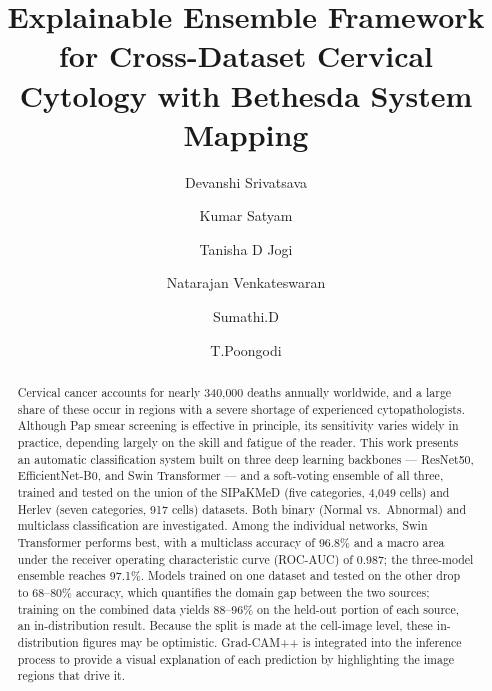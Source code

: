 \documentclass[runningheads]{llncs}
\begin{document}
\title{Explainable Ensemble Framework for Cross-Dataset Cervical Cytology with Bethesda System Mapping}

\author{Devanshi Srivatsava \and
Kumar Satyam \and
Tanisha D Jogi \and
Natarajan Venkateswaran \and
Sumathi.D \and
T.Poongodi}



\maketitle

\begin{abstract}
Cervical cancer accounts for nearly 340,000 deaths annually worldwide, and a large share of these occur in regions with a severe shortage of experienced cytopathologists. Although Pap smear screening is effective in principle, its sensitivity varies widely in practice, depending largely on the skill and fatigue of the reader. This work presents an automatic classification system built on three deep learning backbones --- ResNet50, EfficientNet-B0, and Swin Transformer --- and a soft-voting ensemble of all three, trained and tested on the union of the SIPaKMeD (five categories, 4,049 cells) and Herlev (seven categories, 917 cells) datasets. Both binary (Normal vs.\ Abnormal) and multiclass classification are investigated. Among the individual networks, Swin Transformer performs best, with a multiclass accuracy of 96.8\% and a macro area under the receiver operating characteristic curve (ROC-AUC) of 0.987; the three-model ensemble reaches 97.1\%. Models trained on one dataset and tested on the other drop to 68--80\% accuracy, which quantifies the domain gap between the two sources; training on the combined data yields 88--96\% on the held-out portion of each source, an in-distribution result. Because the split is made at the cell-image level, these in-distribution figures may be optimistic. Grad-CAM++ is integrated into the inference process to provide a visual explanation of each prediction by highlighting the image regions that drive it.

\end{abstract}
\end{document}
